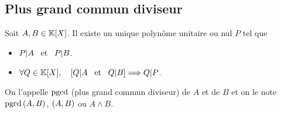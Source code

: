 \documentclass{magnolia}
\begin{document}







\subsection{Plus grand commun diviseur}

\begin{definition}
Soit $A,B\in\polyK$. Il existe un unique polynôme unitaire ou nul $P$ tel que
\begin{itemize}
\item $P|A \quad\!\text{et}\quad\! P|B$.
\item $\forall Q\in\polyK \qsep \cro{Q|A \et Q|B} \implique Q|P$.
\end{itemize}
On l'appelle $\operatorname{pgcd}$ (plus grand commun diviseur) de $A$ et de $B$ et on le note
$\operatorname{pgcd}\left(A,B\right)$, $\left(A,B\right)$ ou $A\wedge B$.
\end{definition}
\end{document}
